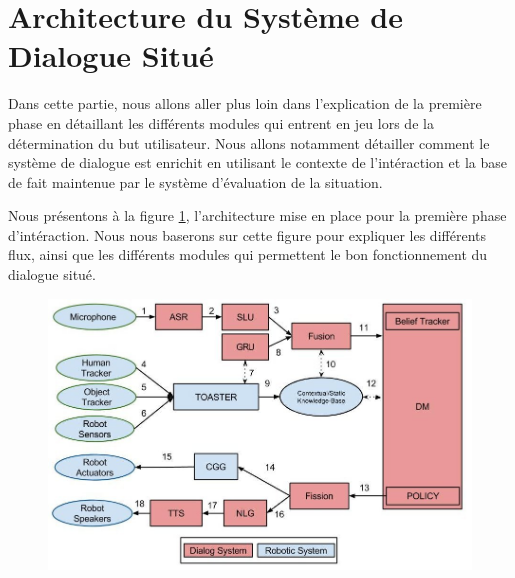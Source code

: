 \documentclass[a4paper,11pt,twoside]{StyleThese}
\begin{document}




\section{Architecture du Système de Dialogue Situé}

Dans cette partie, nous allons aller plus loin dans l'explication de la première phase en détaillant les différents modules qui entrent en jeu lors de la détermination du but utilisateur. Nous allons notamment détailler comment le système de dialogue est enrichit en utilisant le contexte de l'intéraction et la base de fait maintenue par le système d'évaluation de la situation.

Nous présentons à la figure \ref{fig:archiphase1}, l'architecture mise en place pour la première phase d'intéraction. Nous nous baserons sur cette figure pour expliquer les différents flux, ainsi que les différents modules qui permettent le bon fonctionnement du dialogue situé.


\begin{figure}[ht!]
 \centering
  \includegraphics[width=0.89\linewidth]{./img/archiphase1.jpg} 
  \caption {}
  \label{fig:archiphase1}
\end{figure}
\end{document}
